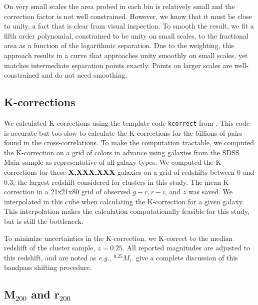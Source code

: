 \documentclass{emulateapj}
\begin{document}
On very small scales the area probed in each bin is relatively small
and the correction factor is not well constrained.  However, we know
that it must be close to unity, a fact that is clear from visual
inspection.  To smooth the result, we fit a fifth order polynomial,
constrained to be unity on small scales, to the fractional area as a
function of the logarithmic separation.  Due to the weighting, this
approach results in a curve that approaches unity smoothly on small
scales, yet matches intermediate separation points exactly.  Points on
larger scales are well-constrained and do not need smoothing.



\subsection{K-corrections} \label{sec:kcorr}

We calculated K-corrections using the template code \texttt{kcorrect} from
\citet{BlantonKcorr03}.  This code is accurate but too slow to calculate the
K-corrections for the billions of pairs found in the cross-correlations. To
make the computation tractable, we computed the K-correction on a grid of colors in advance using
galaxies from the SDSS Main sample as representative of all galaxy types. We
computed the K-corrections for these {\bf X,XXX,XXX} galaxies on a grid of redshifts between 0 and 0.3,
the largest redshift considered for clusters in this study.  The mean
K-correction in a 21x21x80 grid of observed $g-r, r-i$, and $z$ was saved.  We
interpolated in this cube when calculating the K-correction for a given
galaxy. This interpolation makes the calculation computationally feasible for
this study, but is still the bottleneck.


To minimize uncertainties in the K-correction, we K-correct to the
median redshift of the cluster sample, $z = 0.25$. All reported
magnitudes are adjusted to this redshift, and are noted as {\it e.g.,} $^{0.25}M_i$. \citet{Blanton03} give a complete discussion of this bandpass shifting procedure.

\subsection{M$_{200}$ and r$_{200}$} \label{sec:mass-obs}
\end{document}
